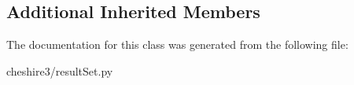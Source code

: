 \subsection*{Additional Inherited Members}


The documentation for this class was generated from the following file\-:\begin{DoxyCompactItemize}
\item 
cheshire3/result\-Set.\-py\end{DoxyCompactItemize}
